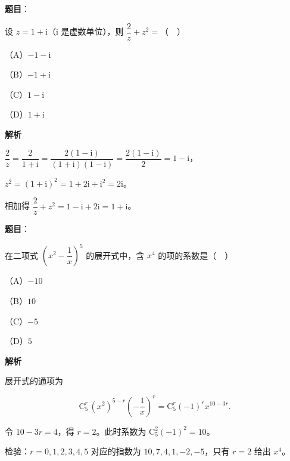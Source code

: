 \begin{answer}

\textbf{题目}：

设 $z=1+\mathrm i$（$\mathrm i$ 是虚数单位），则 $\dfrac2z+z^2=$（　）

（A）$-1-\mathrm i$

（B）$-1+\mathrm i$

（C）$1-\mathrm i$

（D）$1+\mathrm i$

\textbf{解析}

$\dfrac2z=\dfrac{2}{1+\mathrm i}=\dfrac{2(1-\mathrm i)}{(1+\mathrm i)(1-\mathrm i)}=\dfrac{2(1-\mathrm i)}{2}=1-\mathrm i$，

$z^2=(1+\mathrm i)^2=1+2\mathrm i+\mathrm i^2=2\mathrm i$。

相加得 $\dfrac2z+z^2=1-\mathrm i+2\mathrm i=1+\mathrm i$。


\end{answer}
\begin{answer}

\textbf{题目}：

在二项式 $\left(x^2-\dfrac1x\right)^5$ 的展开式中，含 $x^4$ 的项的系数是（　）

（A）$-10$

（B）$10$

（C）$-5$

（D）$5$

\textbf{解析}

展开式的通项为

\nopagebreak[4]
\[\mathrm C_5^r\,(x^2)^{5-r}\left(-\frac1x\right)^r=\mathrm C_5^r(-1)^r x^{10-3r}.\]

令 $10-3r=4$，得 $r=2$。此时系数为 $\mathrm C_5^2(-1)^2=10$。

检验：$r=0,1,2,3,4,5$ 对应的指数为 $10,7,4,1,-2,-5$，只有 $r=2$ 给出 $x^4$。


\end{answer}
